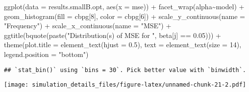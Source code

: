 \documentclass[
]{article}
\newenvironment{Shaded}{\begin{snugshade}}{\end{snugshade}}
\newcommand{\AttributeTok}[1]{\textcolor[rgb]{0.77,0.63,0.00}{#1}}
\newcommand{\DecValTok}[1]{\textcolor[rgb]{0.00,0.00,0.81}{#1}}
\newcommand{\FloatTok}[1]{\textcolor[rgb]{0.00,0.00,0.81}{#1}}
\newcommand{\FunctionTok}[1]{\textcolor[rgb]{0.00,0.00,0.00}{#1}}
\newcommand{\NormalTok}[1]{#1}
\newcommand{\SpecialCharTok}[1]{\textcolor[rgb]{0.00,0.00,0.00}{#1}}
\newcommand{\StringTok}[1]{\textcolor[rgb]{0.31,0.60,0.02}{#1}}
\begin{document}
\begin{Shaded}
\begin{Highlighting}[]
\FunctionTok{ggplot}\NormalTok{(}\AttributeTok{data =}\NormalTok{ results.smallB.opt,}
       \FunctionTok{aes}\NormalTok{(}\AttributeTok{x =}\NormalTok{ mse)) }\SpecialCharTok{+}
  \FunctionTok{facet\_wrap}\NormalTok{(alpha}\SpecialCharTok{\textasciitilde{}}\NormalTok{model) }\SpecialCharTok{+}
  \FunctionTok{geom\_histogram}\NormalTok{(}\AttributeTok{fill =}\NormalTok{ cbpg[}\DecValTok{8}\NormalTok{], }\AttributeTok{color =}\NormalTok{ cbpg[}\DecValTok{6}\NormalTok{]) }\SpecialCharTok{+}
  \FunctionTok{scale\_y\_continuous}\NormalTok{(}\AttributeTok{name =} \StringTok{"Frequency"}\NormalTok{) }\SpecialCharTok{+}
  \FunctionTok{scale\_x\_continuous}\NormalTok{(}\AttributeTok{name =} \StringTok{"MSE"}\NormalTok{) }\SpecialCharTok{+}
  \FunctionTok{ggtitle}\NormalTok{(}\FunctionTok{bquote}\NormalTok{(}\FunctionTok{paste}\NormalTok{(}\StringTok{"Distribution(s) of MSE for "}\NormalTok{, beta[j] }\SpecialCharTok{==} \FloatTok{0.05}\NormalTok{))) }\SpecialCharTok{+}
  \FunctionTok{theme}\NormalTok{(}\AttributeTok{plot.title =} \FunctionTok{element\_text}\NormalTok{(}\AttributeTok{hjust =} \FloatTok{0.5}\NormalTok{), }
        \AttributeTok{text =} \FunctionTok{element\_text}\NormalTok{(}\AttributeTok{size =} \DecValTok{14}\NormalTok{),}
        \AttributeTok{legend.position =} \StringTok{"bottom"}\NormalTok{)}
\end{Highlighting}
\end{Shaded}

\begin{verbatim}
## `stat_bin()` using `bins = 30`. Pick better value with `binwidth`.
\end{verbatim}

\texttt{[image: simulation\_details\_files/figure-latex/unnamed-chunk-21-2.pdf]}
\end{document}
